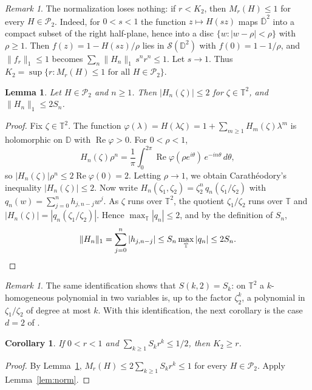 \documentclass[11pt]{amsart}
\newtheorem{lemma}[theorem]{Lemma}
\newtheorem{corollary}[theorem]{Corollary}
\theoremstyle{remark}
\newtheorem{remark}[theorem]{Remark}
\numberwithin{equation}{section}
\newcommand{\D}{\mathbb{D}}
\newcommand{\T}{\mathbb{T}}
\newcommand{\Pclass}{\mathcal{P}_2}
\begin{document}
\begin{remark}\label{rem:converse}
The normalization loses nothing: if $r<K_2$, then $M_r(H)\le1$ for every $H\in\Pclass$. Indeed, for $0<s<1$ the function $z\mapsto H(sz)$ maps $\overline{\D}^2$ into a compact subset of the right half-plane, hence into a disc $\{w:|w-\rho|<\rho\}$ with $\rho\ge1$. Then $f(z)=1-H(sz)/\rho$ lies in $\mathcal S(\D^2)$ with $f(0)=1-1/\rho$, and $\|f_r\|_1\le1$ becomes $\sum_n\|H_n\|_1\,s^nr^n\le1$. Let $s\to1$. Thus $K_2=\sup\{r:M_r(H)\le1\text{ for all }H\in\Pclass\}$.
\end{remark}

\begin{lemma}\label{lem:slice}
Let $H\in\Pclass$ and $n\ge1$. Then $|H_n(\zeta)|\le2$ for $\zeta\in\T^2$, and $\|H_n\|_1\le2S_n$.
\end{lemma}

\begin{proof}
Fix $\zeta\in\T^2$. The function $\varphi(\lambda)=H(\lambda\zeta)=1+\sum_{m\ge1}H_m(\zeta)\lambda^m$ is holomorphic on $\D$ with $\operatorname{Re}\varphi>0$. For $0<\rho<1$,
\[
H_n(\zeta)\rho^n=\frac1\pi\int_0^{2\pi}\operatorname{Re}\varphi(\rho e^{i\theta})\,e^{-in\theta}\,d\theta,
\]
so $|H_n(\zeta)|\rho^n\le2\operatorname{Re}\varphi(0)=2$. Letting $\rho\to1$, we obtain Carath\'eodory's inequality $|H_n(\zeta)|\le2$. Now write $H_n(\zeta_1,\zeta_2)=\zeta_2^n\,q_n(\zeta_1/\zeta_2)$ with $q_n(w)=\sum_{j=0}^nh_{j,n-j}w^j$. As $\zeta$ runs over $\T^2$, the quotient $\zeta_1/\zeta_2$ runs over $\T$ and $|H_n(\zeta)|=|q_n(\zeta_1/\zeta_2)|$. Hence $\max_\T|q_n|\le2$, and by the definition of $S_n$,
\[
\|H_n\|_1=\sum_{j=0}^n|h_{j,n-j}|\le S_n\max_\T|q_n|\le2S_n.\qedhere
\]
\end{proof}

\begin{remark}\label{rem:skd}
The same identification shows that $S(k,2)=S_k$: on $\T^2$ a $k$-homogeneous polynomial in two variables is, up to the factor $\zeta_2^k$, a polynomial in $\zeta_1/\zeta_2$ of degree at most $k$. With this identification, the next corollary is the case $d=2$ of \cite[Theorem~3.3]{BCGMMS21}.
\end{remark}

\begin{corollary}\label{cor:sidon}
If $0<r<1$ and $\sum_{k\ge1}S_kr^k\le1/2$, then $K_2\ge r$.
\end{corollary}

\begin{proof}
By Lemma~\ref{lem:slice}, $M_r(H)\le2\sum_{k\ge1}S_kr^k\le1$ for every $H\in\Pclass$. Apply Lemma~\ref{lem:norm}.
\end{proof}
\end{document}
